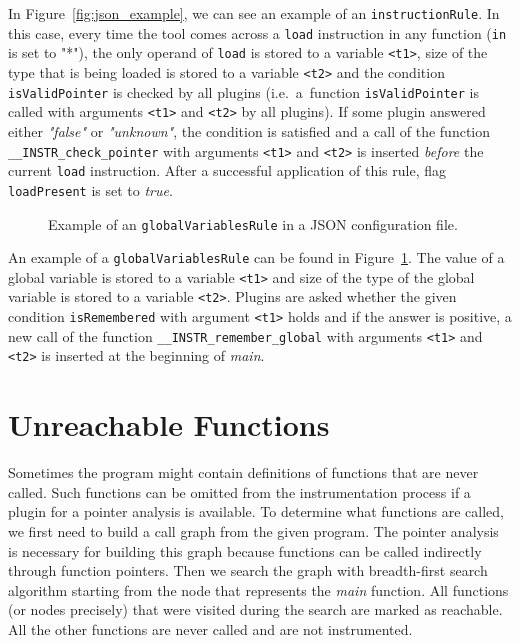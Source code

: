 In Figure~\ref{fig:json_example}, we can see an example of an
\texttt{instructionRule}. In this case, every time the tool comes across a
\texttt{load} instruction in any function (\texttt{in} is set to "*"), the only
operand of \texttt{load} is stored to a variable \texttt{<t1>}, size of the
type that is being loaded is stored to a variable \texttt{<t2>} and the condition
\texttt{isValidPointer} is checked by all plugins (i.e.~a~function
\texttt{isValidPointer} is called with arguments \texttt{<t1>} and
\texttt{<t2>} by all plugins). If some plugin answered either \emph{"false"} or
\emph{"unknown"}, the condition is satisfied and a call of the function
\texttt{\_\_INSTR\_check\_pointer} with arguments \texttt{<t1>} and
\texttt{<t2>} is inserted \emph{before} the current \texttt{load} instruction.
After a successful application of this rule, flag \texttt{loadPresent} is set
to \emph{true}.

\begin{figure}[h]

\caption{Example of an \texttt{globalVariablesRule} in a JSON configuration file.}
\label{fig:json_example2}
\end{figure}


An example of a \texttt{globalVariablesRule} can be found in
Figure~\ref{fig:json_example2}. The value of a global variable is stored to a
variable \texttt{<t1>} and size of the type of the global variable is stored to
a variable \texttt{<t2>}. Plugins are asked whether the given condition
\texttt{isRemembered} with argument \texttt{<t1>} holds and if the answer is
positive, a new call of the function \texttt{\_\_INSTR\_remember\_global} with
arguments \texttt{<t1>} and \texttt{<t2>} is inserted at the beginning of
\emph{main}.

\section{Unreachable Functions}

Sometimes the program might contain definitions of functions that are never
called. Such functions can be omitted from the instrumentation process if a
plugin for a pointer analysis is available. To determine what functions are
called, we first need to build a call graph from the given program. The pointer
analysis is necessary for building this graph because functions can be called
indirectly through function pointers. Then we search the graph with
breadth-first search algorithm starting from the node that represents the
\emph{main} function. All functions (or nodes precisely) that were visited
during the search are marked as reachable. All the other functions are never
called and are not instrumented.


